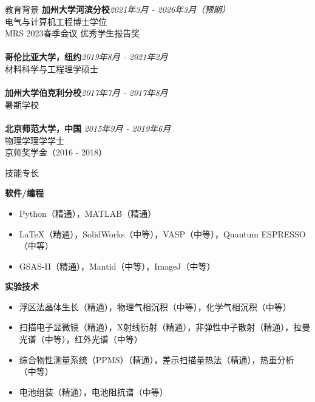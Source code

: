 \documentclass{resume} %
\begin{document}

\begin{rSection}{教育背景}
{\bf 加州大学河滨分校}\hfill{\em 2021年3月 - 2026年3月（预期）}
\\ 电气与计算机工程博士学位
\\ MRS 2023春季会议 优秀学生报告奖
\\
\\{\bf 哥伦比亚大学，纽约}\hfill{\em 2019年8月 - 2021年2月} 
\\ 材料科学与工程理学硕士
\\
\\{\bf 加州大学伯克利分校}\hfill{\em 2017年7月 - 2017年8月}
\\ 暑期学校
\\
\\{\bf 北京师范大学，中国} \hfill {\em 2015年9月 - 2019年6月} 
\\ 物理学理学学士
\\ 京师奖学金（2016 - 2018）

\end{rSection}

\begin{rSection}{技能专长}

	\textbf{软件/编程}
\begin{itemize}
    \item Python（精通），MATLAB（精通）
    \item LaTeX（精通），SolidWorks（中等），VASP（中等），Quantum ESPRESSO（中等）
    \item GSAS-II（精通），Mantid（中等），ImageJ（中等）
\end{itemize}

	\textbf{实验技术}
\begin{itemize}
    \item 浮区法晶体生长（精通），物理气相沉积（中等），化学气相沉积（中等）
    \item 扫描电子显微镜（精通），X射线衍射（精通），非弹性中子散射（精通），拉曼光谱（中等），红外光谱（中等）
    \item 综合物性测量系统（PPMS）（精通），差示扫描量热法（精通），热重分析（中等）
    \item 电池组装（精通），电池阻抗谱（中等）
\end{itemize}

\end{rSection}
\end{document}
